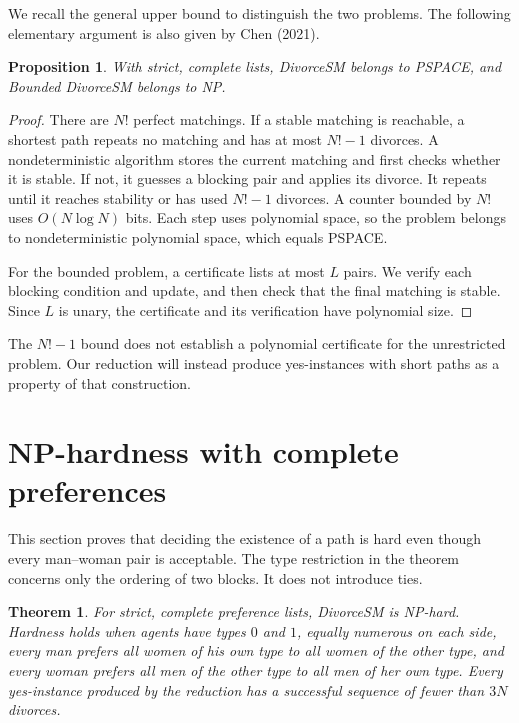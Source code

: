 \documentclass[11pt,letterpaper]{article}
\newtheorem{theorem}{Theorem}
\newtheorem{proposition}{Proposition}
\theoremstyle{definition}
\begin{document}
We recall the general upper bound to distinguish the two problems. The following elementary argument is also given by Chen (2021).

\begin{proposition}
With strict, complete lists, DivorceSM belongs to PSPACE, and Bounded DivorceSM belongs to NP.
\end{proposition}
\begin{proof}
There are $N!$ perfect matchings. If a stable matching is reachable, a shortest path repeats no matching and has at most $N!-1$ divorces. A nondeterministic algorithm stores the current matching and first checks whether it is stable. If not, it guesses a blocking pair and applies its divorce. It repeats until it reaches stability or has used $N!-1$ divorces. A counter bounded by $N!$ uses $O(N\log N)$ bits. Each step uses polynomial space, so the problem belongs to nondeterministic polynomial space, which equals PSPACE.

For the bounded problem, a certificate lists at most $L$ pairs. We verify each blocking condition and update, and then check that the final matching is stable. Since $L$ is unary, the certificate and its verification have polynomial size.
\end{proof}

The $N!-1$ bound does not establish a polynomial certificate for the unrestricted problem. Our reduction will instead produce yes-instances with short paths as a property of that construction.

\section{NP-hardness with complete preferences}

This section proves that deciding the existence of a path is hard even though every man--woman pair is acceptable. The type restriction in the theorem concerns only the ordering of two blocks. It does not introduce ties.

\begin{theorem}
For strict, complete preference lists, DivorceSM is NP-hard. Hardness holds when agents have types $0$ and $1$, equally numerous on each side, every man prefers all women of his own type to all women of the other type, and every woman prefers all men of the other type to all men of her own type. Every yes-instance produced by the reduction has a successful sequence of fewer than $3N$ divorces.
\end{theorem}
\end{document}
